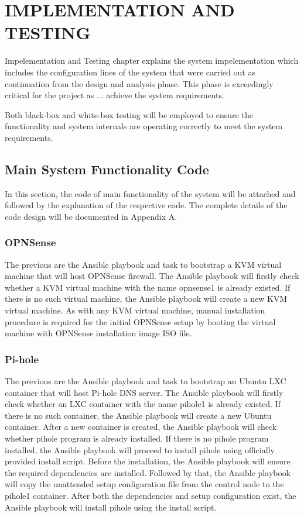 \documentclass[../index.tex]{subfiles}
\begin{document}
\chapter{IMPLEMENTATION AND TESTING}

Impelementation and Testing chapter explains the system impelementation which includes the
configuration lines of the system that were carried out as continuation from the design and analysis
phase. This phase is exceedingly critical for the project as ... achieve the system requirements.

Both black-box and white-box testing will be employed to ensure the functionality and system
internals are operating correctly to meet the system requirements.

\section{Main System Functionality Code}

In this section, the code of main functionality of the system will be attached and followed by the
explanation of the respective code. The complete details of the code design will be documented in
Appendix A.

\subsection{OPNSense}

The previous are the Ansible playbook and task to bootstrap a KVM virtual machine that will host
OPNSense firewall. The Ansible playbook will firstly check whether a KVM virtual machine with the
name opnsense1 is already existed. If there is no such virtual machine, the Ansible playbook will
create a new KVM virtual machine. As with any KVM virtual machine, manual installation procedure is
required for the initial OPNSense setup by booting the virtual machine with OPNSense installation
image ISO file.

\subsection{Pi-hole}

The previous are the Ansible playbook and task to bootstrap an Ubuntu LXC container that will host
Pi-hole DNS server. The Ansible playbook will firstly check whether an LXC container with the name
pihole1 is already existed. If there is no such container, the Ansible playbook will create a new
Ubuntu container. After a new container is created, the Ansible playbook will check whether pihole
program is already installed. If there is no pihole program installed, the Ansible playbook will
proceed to install pihole using officially provided install script. Before the installation, the
Ansible playbook will ensure the required dependencies are installed. Followed by that, the Ansible
playbook will copy the unattended setup configuration file from the control node to the pihole1
container. After both the dependencies and setup configuration exist, the Ansible playbook will
install pihole using the install script.
\end{document}
